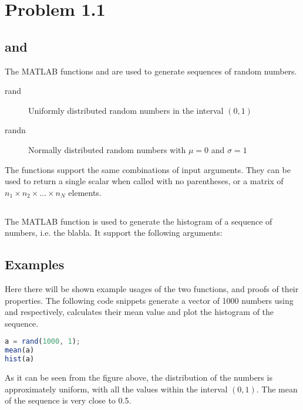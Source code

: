 \section{Problem 1.1}

\subsection{ and }
The MATLAB functions  and  are used to generate sequences of random numbers.
\begin{description}
	\item[rand] Uniformly distributed random numbers in the interval $ (0, 1) $
	\item[randn] Normally distributed random numbers with $ \mu = 0 $ and $ \sigma = 1 $
\end{description}

The functions support the same combinations of input arguments.
They can be used to return a single scalar when called with no parentheses, or a matrix of $ n_1 \times n_2 \times \dots \times n_N $ elements.


\subsection{}
The MATLAB function  is used to generate the histogram of a sequence of numbers, i.e. the blabla.
It support the following arguments:
\begin{description}
	\item[]
	\item[]
\end{description}


\subsection{Examples}
Here there will be shown example usages of the two functions, and proofs of their properties.
The following code snippets generate a vector of 1000 numbers using  and  respectively, calculates their mean value and plot the histogram of the sequence.

\begin{lstlisting}[language=Octave]
a = rand(1000, 1);
mean(a)
hist(a)
\end{lstlisting}

As it can be seen from the figure above, the distribution of the numbers is approximately uniform, with all the values within the interval $ (0, 1) $.
The mean of the sequence is very close to 0.5.

